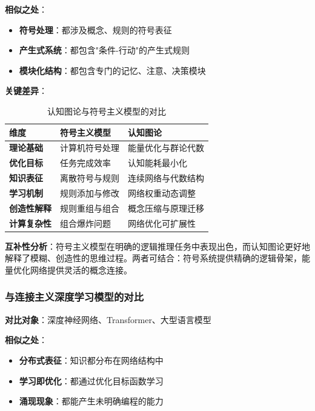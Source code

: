 \documentclass[12pt,a4paper]{article}
\begin{document}
\textbf{相似之处}：
\begin{itemize}
\item \textbf{符号处理}：都涉及概念、规则的符号表征
\item \textbf{产生式系统}：都包含"条件-行动"的产生式规则
\item \textbf{模块化结构}：都包含专门的记忆、注意、决策模块
\end{itemize}

\textbf{关键差异}：
\begin{table}[H]
\centering
\caption{认知图论与符号主义模型的对比}
\label{tab:vs_symbolic_models}
\begin{tabular}{p{3cm}p{4cm}p{4cm}}
\toprule
\textbf{维度} & \textbf{符号主义模型} & \textbf{认知图论} \\
\midrule
\textbf{理论基础} & 计算机符号处理 & 能量优化与群论代数 \\
\textbf{优化目标} & 任务完成效率 & 认知能耗最小化 \\
\textbf{知识表征} & 离散符号与规则 & 连续网络与代数结构 \\
\textbf{学习机制} & 规则添加与修改 & 网络权重动态调整 \\
\textbf{创造性解释} & 规则重组与组合 & 概念压缩与原理迁移 \\
\textbf{计算复杂性} & 组合爆炸问题 & 网络优化可扩展性 \\
\bottomrule
\end{tabular}
\end{table}

\textbf{互补性分析}：符号主义模型在明确的逻辑推理任务中表现出色，而认知图论更好地解释了模糊、创造性的思维过程。两者可结合：符号系统提供精确的逻辑骨架，能量优化网络提供灵活的概念连接。

\subsubsection{与连接主义深度学习模型的对比}
\label{subsubsec:vs_connectionist_models}

\textbf{对比对象}：深度神经网络、Transformer、大型语言模型

\textbf{相似之处}：
\begin{itemize}
\item \textbf{分布式表征}：知识都分布在网络结构中
\item \textbf{学习即优化}：都通过优化目标函数学习
\item \textbf{涌现现象}：都能产生未明确编程的能力
\end{itemize}
\end{document}
